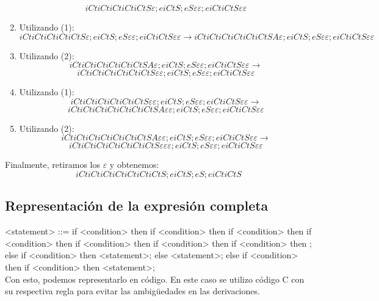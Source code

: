 \documentclass[11pt]{article}
\begin{document}
\begin{enumerate}
\[iCtiCtiCtiCtiCtS\varepsilon;eiCtS;eS\varepsilon\varepsilon;eiCtiCtS\varepsilon\varepsilon \]
\item Utilizando (1): \[ iCtiCtiCtiCtiCtS\varepsilon;eiCtS;eS\varepsilon\varepsilon;eiCtiCtS\varepsilon\varepsilon \rightarrow 
iCtiCtiCtiCtiCtiCtSA\varepsilon;eiCtS;eS\varepsilon\varepsilon;eiCtiCtS\varepsilon\varepsilon \]
\item Utilizando (2): \[ iCtiCtiCtiCtiCtiCtSA\varepsilon;eiCtS;eS\varepsilon\varepsilon;eiCtiCtS\varepsilon\varepsilon \rightarrow  \] \[ iCtiCtiCtiCtiCtiCtS\varepsilon\varepsilon;eiCtS;eS\varepsilon\varepsilon;eiCtiCtS\varepsilon\varepsilon \]
\item Utilizando (1): \[ iCtiCtiCtiCtiCtiCtS\varepsilon\varepsilon;eiCtS;eS\varepsilon\varepsilon;eiCtiCtS\varepsilon\varepsilon \rightarrow  \] \[ iCtiCtiCtiCtiCtiCtiCtSA\varepsilon\varepsilon;eiCtS;eS\varepsilon\varepsilon;eiCtiCtS\varepsilon\varepsilon \]
\item Utilizando (2): \[ iCtiCtiCtiCtiCtiCtiCtSA\varepsilon\varepsilon;eiCtS;eS\varepsilon\varepsilon;eiCtiCtS\varepsilon\varepsilon \rightarrow \] \[ iCtiCtiCtiCtiCtiCtiCtS\varepsilon\varepsilon\varepsilon;eiCtS;eS\varepsilon\varepsilon;eiCtiCtS\varepsilon\varepsilon \]

\end{enumerate}

\vspace{1em}
Finalmente, retiramos los $ \varepsilon $ y obtenemos: \[ iCtiCtiCtiCtiCtiCtiCtS;eiCtS;eS;eiCtiCtS \]

\subsection{Representación de la expresión completa}

<statement> ::= if <condition> then if <condition> then if <condition> then if <condition> then if <condition> then if <condition> then if <condition> then ; else if <condition> then <statement>; else <statement>;  else if <condition> then if <condition> then <statement>;\\

Con esto, podemos representarlo en código. En este caso se utilizo código C con su respectiva regla para evitar las ambigüedades en las derivaciones.
\end{document}
